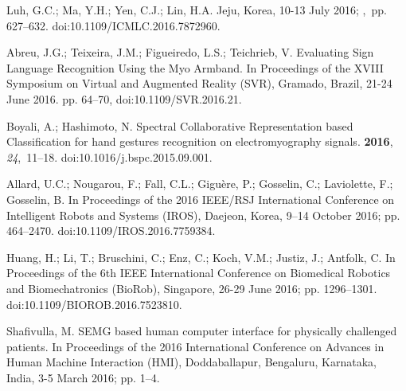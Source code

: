 \documentclass[sensors,review,accept,moreauthors,pdftex]{Definitions/mdpi}
\begin{document}
\begin{thebibliography}{999}
Luh, G.C.; Ma, Y.H.; Yen, C.J.; Lin, H.A.
 { Jeju, Korea, 10-13 July 2016};
,~pp. 627--632. doi:10.1109/ICMLC.2016.7872960.

Abreu, J.G.; Teixeira, J.M.; Figueiredo, L.S.; Teichrieb, V.
\newblock Evaluating Sign Language Recognition Using the Myo Armband. In {Proceedings of the XVIII Symposium on Virtual and Augmented Reality (SVR),} Gramado, Brazil, 21-24 June 2016.
\newblock pp. 64--70, doi:10.1109/SVR.2016.21.

Boyali, A.; Hashimoto, N.
\newblock Spectral Collaborative Representation based Classification for hand
  gestures recognition on electromyography signals.
 {\bf 2016}, {\em
  24},~11--18. doi:10.1016/j.bspc.2015.09.001.

Allard, U.C.; Nougarou, F.; Fall, C.L.; Gigu{\`e}re, P.; Gosselin, C.;
  Laviolette, F.; Gosselin, B.
 In {Proceedings of the 2016 IEEE/RSJ International Conference on Intelligent Robots and Systems (IROS)}, {Daejeon, Korea, 9--14 October 2016};
\newblock pp. 464--2470. doi:10.1109/IROS.2016.7759384.

Huang, H.; Li, T.; Bruschini, C.; Enz, C.; Koch, V.M.; Justiz, J.; Antfolk, C.
 {In {Proceedings of the 6th IEEE International Conference on Biomedical Robotics and Biomechatronics (BioRob),} Singapore, 26-29 June 2016};
\newblock pp. 1296--1301. doi:10.1109/BIOROB.2016.7523810.

Shafivulla, M.
\newblock SEMG based human computer interface for physically challenged
  patients. In {Proceedings of the }2016 International Conference on Advances in Human Machine Interaction (HMI), Doddaballapur, Bengaluru, Karnataka, India, 3-5 March 2016;
\newblock pp. 1--4.


\end{thebibliography}
\end{document}
